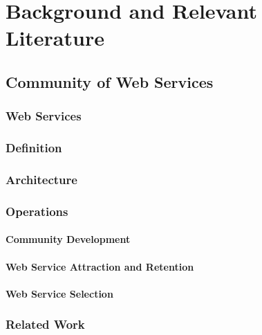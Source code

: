 \setcounter{chapter}{1}

\chapter{Background and Relevant Literature}\label{sec:MAS}




    \section{Community of Web Services}\label{sec:CommunityWS}


        \subsection{Web Services}\label{sec:WS}


        \subsection{Definition}\label{sec:CWSDefinition}

        \subsection{Architecture}\label{sec:CWSArchitecture}

        \subsection{Operations}\label{sec:CWSOperations}

            \subsubsection{Community Development}\label{sec:CWSCommunityDev}

            \subsubsection{Web Service Attraction and Retention}\label{sec:CWSAttraction}

            \subsubsection{Web Service Selection}\label{sec:CWSSelection}

    \subsection{Related Work}\label{sec:CWSRelatedWork}



